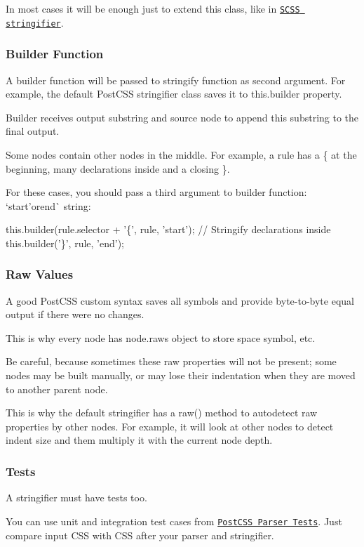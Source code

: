 In most cases it will be enough just to extend this class, like in \href{https://github.com/postcss/postcss-scss/blob/master/lib/scss-stringifier.es6}{\tt S\+C\+SS stringifier}.

\subsubsection*{Builder Function}

A builder function will be passed to {\ttfamily stringify} function as second argument. For example, the default Post\+C\+SS stringifier class saves it to {\ttfamily this.\+builder} property.

Builder receives output substring and source node to append this substring to the final output.

Some nodes contain other nodes in the middle. For example, a rule has a {\ttfamily \{} at the beginning, many declarations inside and a closing {\ttfamily \}}.

For these cases, you should pass a third argument to builder function\+: `\textquotesingle{}start'{\ttfamily or}\textquotesingle{}end\textquotesingle{}\`{} string\+:


\begin{DoxyCode}
this.builder(rule.selector + '\{', rule, 'start');
// Stringify declarations inside
this.builder('\}', rule, 'end');
\end{DoxyCode}


\subsubsection*{Raw Values}

A good Post\+C\+SS custom syntax saves all symbols and provide byte-\/to-\/byte equal output if there were no changes.

This is why every node has {\ttfamily node.\+raws} object to store space symbol, etc.

Be careful, because sometimes these raw properties will not be present; some nodes may be built manually, or may lose their indentation when they are moved to another parent node.

This is why the default stringifier has a {\ttfamily raw()} method to autodetect raw properties by other nodes. For example, it will look at other nodes to detect indent size and them multiply it with the current node depth.

\subsubsection*{Tests}

A stringifier must have tests too.

You can use unit and integration test cases from \href{https://github.com/postcss/postcss-parser-tests}{\tt Post\+C\+SS Parser Tests}. Just compare input C\+SS with C\+SS after your parser and stringifier. 